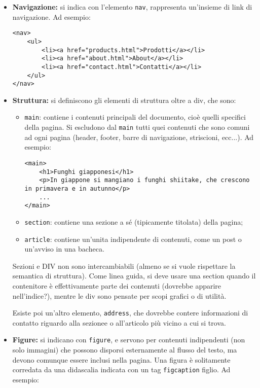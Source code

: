\documentclass[a4paper,11pt]{article}
\begin{document}
\begin{itemize}
	\item \textbf{Navigazione:} si indica con l'elemento \lstinline|nav|, rappresenta un'insieme di link di navigazione. Ad esempio:
\begin{lstlisting}
<nav>
	<ul>
		<li><a href="products.html">Prodotti</a></li>
		<li><a href="about.html">About</a></li>
		<li><a href="contact.html">Contatti</a></li>
	</ul>
</nav>
\end{lstlisting}
	\item \textbf{Struttura:} si definiscono gli elementi di struttura oltre a div, che sono:
		\begin{itemize}
			\item \lstinline|main|: contiene i contenuti principali del documento, cioè quelli specifici della pagina.
				Si escludono dal \lstinline|main| tutti quei contenuti che sono comuni ad ogni pagina (header, footer, barre di navigazione, striscioni, ecc...). Ad esempio:
\begin{lstlisting}
<main>
	<h1>Funghi giapponesi</h1>
	<p>In giappone si mangiano i funghi shiitake, che crescono in primavera e in autunno</p>
	...
</main>
\end{lstlisting}
			\item \lstinline|section|: contiene una sezione a sé (tipicamente titolata) della pagina;
			\item \lstinline|article|: contiene un'unita indipendente di contenuti, come un post o un'avviso in una bacheca.
		\end{itemize}
Sezioni e DIV non sono intercambiabili (almeno se si vuole rispettare la semantica di struttura).
Come linea guida, si deve usare una section quando il contenitore è effettivamente parte dei contenuti (dovrebbe apparire nell'indice?), mentre le div sono pensate per scopi grafici o di utilità.

Esiste poi un'altro elemento, \lstinline|address|, che dovrebbe contere informazioni di contatto riguardo alla sezionee o all'articolo più vicino a cui si trova.
	\item \textbf{Figure:} si indicano con \lstinline|figure|, e servono per contenuti indipendenti (non solo immagini) che possono disporsi esternamente al flusso del testo, ma devono comunque essere inclusi nella pagina.
		Una figura è solitamente corredata da una didascalia indicata con un tag \lstinline|figcaption| figlio. Ad esempio:


\end{itemize}
\end{document}
